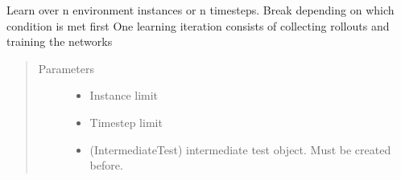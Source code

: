 \documentclass[letterpaper,10pt,english]{sphinxmanual}
\begin{document}
\begin{fulllineitems}
\begin{fulllineitems}
\begin{quote}
\begin{description}
\end{description}\end{quote}

\end{fulllineitems}


\begin{fulllineitems}
\label{\detokenize{agents.reinforcement_learning:agents.reinforcement_learning.ppo_masked.MaskedPPO.learn}}
\sphinxAtStartPar
Learn over n environment instances or n timesteps. Break depending on which condition is met first
One learning iteration consists of collecting rollouts and training the networks
\begin{quote}\begin{description}
\item[{Parameters}] \leavevmode\begin{itemize}
\item {} 
\sphinxAtStartPar
{} \textendash{} Instance limit

\item {} 
\sphinxAtStartPar
{} \textendash{} Timestep limit

\item {} 
\sphinxAtStartPar
{} \textendash{} (IntermediateTest) intermediate test object. Must be created before.

\end{itemize}

\end{description}\end{quote}

\end{fulllineitems}


\end{fulllineitems}

\end{document}
